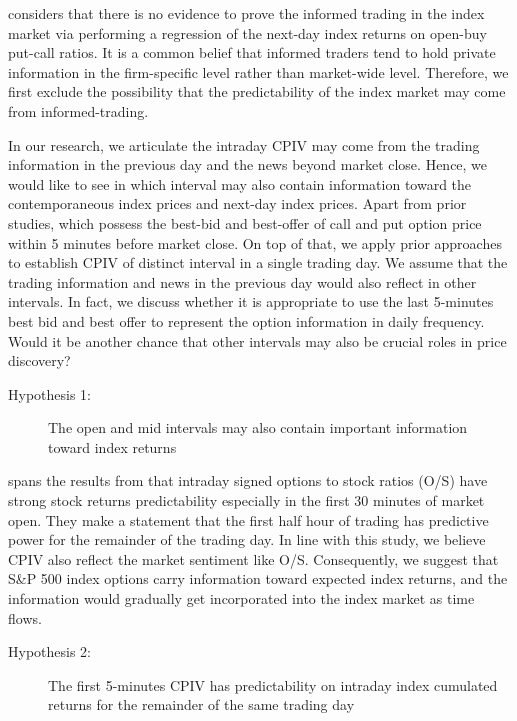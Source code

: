 
\textcite{pan2006information} considers that there is no evidence to prove the informed trading in the index market via performing a regression of the next-day index returns on open-buy put-call ratios. It is a common belief that informed traders tend to hold private information in the firm-specific level rather than market-wide level. Therefore, we first exclude the possibility that the predictability of the index market may come from informed-trading. 

In our research, we articulate the intraday CPIV may come from the trading information in the previous day and the news beyond market close. Hence, we would like to see in which interval may also contain information toward the contemporaneous index prices and next-day index prices. Apart from prior studies, which possess the best-bid and best-offer of call and put option price within 5 minutes before market close. On top of that, we apply prior approaches to establish CPIV of distinct interval in a single trading day. We assume that the trading information and news in the previous day would also reflect in other intervals. In fact, we discuss whether it is appropriate to use the last 5-minutes best bid and best offer to represent the option information in daily frequency. Would it be another chance that other intervals may also be crucial roles in price discovery? 

\begin{description}
\item[Hypothesis 1:] The open and mid intervals may also contain important information toward index returns
\end{description}

\textcite{bergsma2018intraday} spans the results from \textcite{easley1998option} that intraday signed options to stock ratios (O/S) have strong stock returns predictability especially in the first 30 minutes of market open. They make a statement that the first half hour of trading has predictive power for the remainder of the trading day. In line with this study, we believe CPIV also reflect the market sentiment like O/S. Consequently, we suggest that S\&P 500 index options carry information toward expected index returns, and the information would gradually get incorporated into the index market as time flows. 

\begin{description} 
\item[Hypothesis 2:] The first 5-minutes CPIV has predictability on intraday index cumulated returns for the remainder of the same trading day
\end{description}




